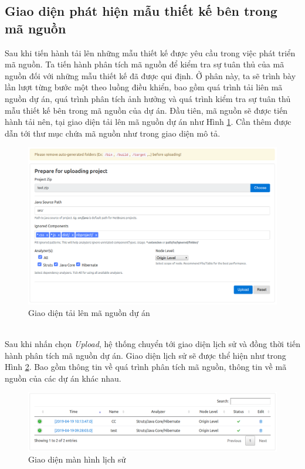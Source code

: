\documentclass[12pt]{report}
\begin{document}
\subsection{Giao diện phát hiện mẫu thiết kế bên trong mã nguồn}
Sau khi tiến hành tải lên những mẫu thiết kế được yêu cầu trong việc phát triển mã nguồn. Ta tiến hành phân tích mã nguồn để kiểm tra sự tuân thủ của mã nguồn đối với những mẫu thiết kế đã được qui định. Ở phân này, ta sẽ trình bày lần lượt từng bước một theo luồng điều khiển, bao gồm quá trình tải liên mã nguồn dự án, quá trình phân tích ảnh hưởng và quá trình kiểm tra sự tuân thủ mẫu thiết kế bên trong mã nguồn của dự án.
Đầu tiên, mã nguồn sẽ được tiến hành tải nên, tại giao diện tải lên mã nguồn dự án như Hình \ref{fig:upload_project_source_code}. Cần thêm được dẫn tới thư mục chứa mã nguồn như trong giao diện mô tả.
\begin{figure}[h]
	\centering
	\includegraphics[scale=0.4]{images/upload_project}
	\caption{Giao diện tải lên mã nguồn dự án}
	\label{fig:upload_project_source_code}
\end{figure}\\
\noindent Sau khi nhấn chọn \textit{Upload}, hệ thống chuyển tới giao diện lịch sử và đồng thời tiến hành phân tích mã nguồn dự án. Giao diện lịch sử sẽ được thể hiện như trong Hình \ref{fig:history_screen}. Bao gồm thông tin về quá trình phân tích mã nguồn, thông tin về mã nguồn của các dự án khác nhau.
\begin{figure}[h]
	\centering
	\includegraphics[scale=0.4]{images/history_screen}
	\caption{Giao diện màn hình lịch sử}
	\label{fig:history_screen}
\end{figure}\\
\end{document}
